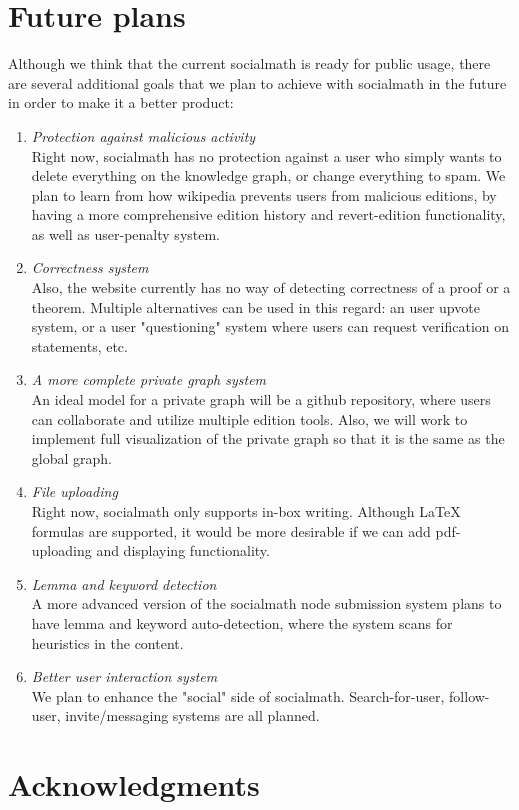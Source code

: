 \documentclass{acm_proc_article-sp}
\begin{document}
\section{Future plans} 
Although we think that the current socialmath is ready for public usage, there are several additional goals that we plan to achieve with socialmath in the future in order to make it a better product:
\begin{enumerate}
\item \emph{Protection against malicious activity} \\
Right now, socialmath has no protection against a user who simply wants to delete everything on the knowledge graph, or change everything to spam. We plan to learn from how wikipedia prevents users from malicious editions, by having a more comprehensive edition history and revert-edition functionality, as well as user-penalty system. 
\item \emph{Correctness system} \\
Also, the website currently has no way of detecting correctness of a proof or a theorem. Multiple alternatives can be used in this regard: an user upvote system, or a user "questioning" system where users can request verification on statements, etc. 
\item \emph{A more complete private graph system} \\
An ideal model for a private graph will be a github repository, where users can collaborate and utilize multiple edition tools. Also, we will work to implement full visualization of the private graph so that it is the same as the global graph. 
\item \emph{File uploading} \\
Right now, socialmath only supports in-box writing. Although LaTeX formulas are supported, it would be more desirable if we can add pdf-uploading and displaying functionality. 
\item \emph{Lemma and keyword detection} \\
A more advanced version of the socialmath node submission system plans to have lemma and keyword auto-detection, where the system scans for heuristics in the content. 
\item \emph{Better user interaction system} \\
We plan to enhance the "social" side of socialmath. Search-for-user, follow-user, invite/messaging systems are all planned. 
\end{enumerate}

\section{Acknowledgments}


%

 
%
%

\end{document}
